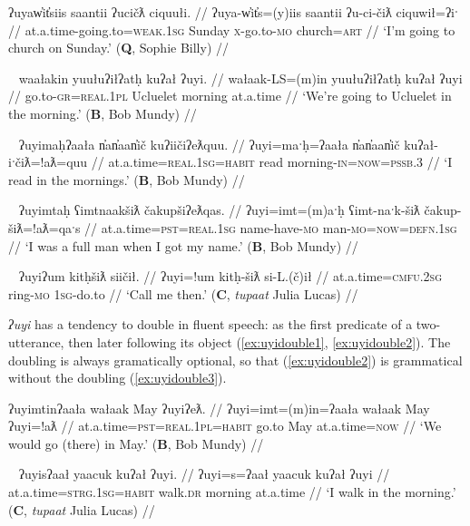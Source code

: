 \ex \label{ex:uyin}
\begingl
\glpreamble ʔuyaw̓it̓siis saantii ʔucičƛ ciquułi. //
\gla ʔuya-w̓it̓s=(y)iis saantii ʔu-ci-čiƛ ciquwił=ʔiˑ //
\glb at.a.time-going.to=\textsc{weak.1sg} Sunday \textsc{x}-go.to-\textsc{mo} church=\textsc{art} //
\glft `I'm going to church on Sunday.' (\textbf{Q}, Sophie Billy) //
\endgl
\xe

\ex~ \label{ex:uyiobj}
\begingl
\glpreamble waałakin yuułuʔiłʔatḥ kuʔał ʔuyi. //
\gla wałaak-LS=(m)in yuułuʔiłʔatḥ kuʔał ʔuyi //
\glb go.to-\textsc{gr}=\textsc{real.1pl} Ucluelet morning at.a.time //
\glft `We're going to Ucluelet in the morning.' (\textbf{B}, Bob Mundy) //
\endgl
\xe

\ex~ \label{ex:uyipssb}
\begingl
\glpreamble ʔuyimaḥʔaała n̓an̓aan̓ič kuʔiičiʔeƛquu. //
\gla ʔuyi=maˑḥ=ʔaała n̓an̓aan̓ič kuʔał-iˑčiƛ=!aƛ=quu //
\glb at.a.time=\textsc{real.1sg}=\textsc{habit} read morning-\textsc{in}=\textsc{now}=\textsc{pssb.3} //
\glft `I read in the mornings.' (\textbf{B}, Bob Mundy) //
\endgl
\xe

\ex~ \label{ex:uyidef}
\begingl
\glpreamble ʔuyimtaḥ ʕimtnaakšiƛ čakupšiʔeƛqas. //
\gla ʔuyi=imt=(m)aˑḥ ʕimt-naˑk-šiƛ čakup-šiƛ=!aƛ=qaˑs //
\glb at.a.time=\textsc{pst}=\textsc{real.1sg} name-have-\textsc{mo} man-\textsc{mo}=\textsc{now}=\textsc{defn.1sg} //
\glft `I was a full man when I got my name.' (\textbf{B}, Bob Mundy) //
\endgl
\xe

\ex~ \label{ex:uyidrop}
\begingl
\glpreamble ʔuyiʔum kitḥšiƛ siičił. //
\gla ʔuyi=!um kitḥ-šiƛ si-L.(č)ił //
\glb at.a.time=\textsc{cmfu.2sg} ring-\textsc{mo} \textsc{1sg}-do.to //
\glft `Call me then.' (\textbf{C}, \textit{tupaat} Julia Lucas) //
\endgl
\xe

\textit{ʔuyi} has a tendency to double in fluent speech: as the first predicate of a two-utterance, then later following its object (\ref{ex:uyidouble1}, \ref{ex:uyidouble2}). The doubling is always gramatically optional, so that (\ref{ex:uyidouble2}) is grammatical without the doubling (\ref{ex:uyidouble3}).

\ex \label{ex:uyidouble1}
\begingl
\glpreamble ʔuyimtinʔaała wałaak May ʔuyiʔeƛ. //
\gla ʔuyi=imt=(m)in=ʔaała wałaak May ʔuyi=!aƛ //
\glb at.a.time=\textsc{pst}=\textsc{real.1pl}=\textsc{habit} go.to May at.a.time=\textsc{now} //
\glft `We would go (there) in May.' (\textbf{B}, Bob Mundy) //
\endgl
\xe

\ex~ \label{ex:uyidouble2}
\begingl
\glpreamble ʔuyisʔaał yaacuk kuʔał ʔuyi. //
\gla ʔuyi=s=ʔaał yaacuk kuʔał ʔuyi //
\glb at.a.time=\textsc{strg.1sg}=\textsc{habit} walk.\textsc{dr} morning at.a.time //
\glft `I walk in the morning.' (\textbf{C}, \textit{tupaat} Julia Lucas) //
\endgl
\xe

